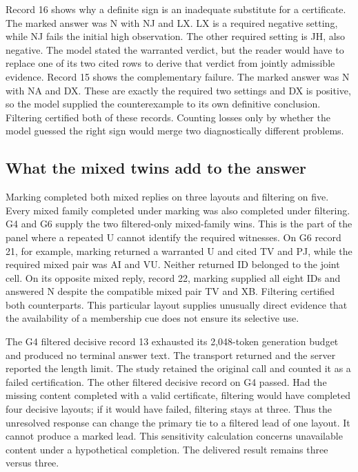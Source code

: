 \documentclass[12pt,letterpaper]{article}
\begin{document}
Record 16 shows why a definite sign is an inadequate substitute for a certificate. The marked answer was N with NJ and LX. LX is a required negative setting, while NJ fails the initial high observation. The other required setting is JH, also negative. The model stated the warranted verdict, but the reader would have to replace one of its two cited rows to derive that verdict from jointly admissible evidence. Record 15 shows the complementary failure. The marked answer was N with NA and DX. These are exactly the required two settings and DX is positive, so the model supplied the counterexample to its own definitive conclusion. Filtering certified both of these records. Counting losses only by whether the model guessed the right sign would merge two diagnostically different problems.

\subsection{What the mixed twins add to the answer}

Marking completed both mixed replies on three layouts and filtering on five. Every mixed family completed under marking was also completed under filtering. G4 and G6 supply the two filtered-only mixed-family wins. This is the part of the panel where a repeated U cannot identify the required witnesses. On G6 record 21, for example, marking returned a warranted U and cited TV and PJ, while the required mixed pair was AI and VU. Neither returned ID belonged to the joint cell. On its opposite mixed reply, record 22, marking supplied all eight IDs and answered N despite the compatible mixed pair TV and XB. Filtering certified both counterparts. This particular layout supplies unusually direct evidence that the availability of a membership cue does not ensure its selective use.

The G4 filtered decisive record 13 exhausted its 2,048-token generation budget and produced no terminal answer text. The transport returned and the server reported the length limit. The study retained the original call and counted it as a failed certification. The other filtered decisive record on G4 passed. Had the missing content completed with a valid certificate, filtering would have completed four decisive layouts; if it would have failed, filtering stays at three. Thus the unresolved response can change the primary tie to a filtered lead of one layout. It cannot produce a marked lead. This sensitivity calculation concerns unavailable content under a hypothetical completion. The delivered result remains three versus three.
\end{document}
